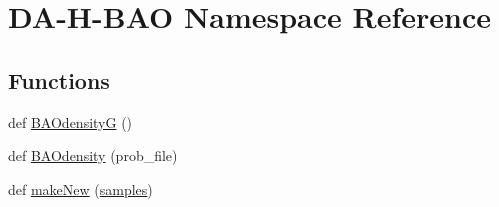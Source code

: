 \hypertarget{namespaceDA-H-BAO}{}\section{D\+A-\/\+H-\/\+B\+AO Namespace Reference}
\label{namespaceDA-H-BAO}
\subsection*{Functions}
\begin{DoxyCompactItemize}
\item 
def \mbox{\hyperlink{namespaceDA-H-BAO_ad99c99db245ed920a8ce4610595df78f}{B\+A\+OdensityG}} ()
\item 
def \mbox{\hyperlink{namespaceDA-H-BAO_aaf711c43bd7501db365be36cc65b28af}{B\+A\+Odensity}} (prob\+\_\+file)
\item 
def \mbox{\hyperlink{namespaceDA-H-BAO_a7ed8e2c76c4e31a068d68d9dd816b08e}{make\+New}} (\mbox{\hyperlink{namespaceDA-H-BAO_a21996e2084da31e693af71a0bb61918b}{samples}})
\end{DoxyCompactItemize}
